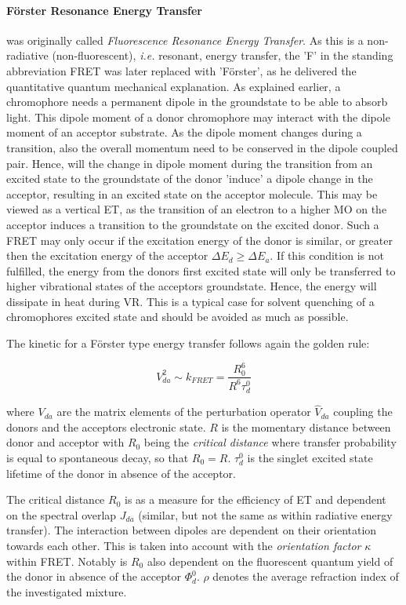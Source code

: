 			\paragraph{Förster Resonance Energy Transfer} was originally called \emph{Fluorescence Resonance Energy Transfer}. As this is a non-radiative (non-fluorescent), \textit{i.e.} resonant, energy transfer, the 'F' in the standing abbreviation FRET was later replaced with 'Förster', as he delivered the quantitative quantum mechanical explanation.%
			As explained earlier, a chromophore needs a permanent dipole in the groundstate to be able to absorb light. This dipole moment of a donor chromophore may interact with the dipole moment of an acceptor substrate. As the dipole moment changes during a transition, also the overall momentum need to be conserved in the dipole coupled  pair. Hence, will the change in dipole moment during the transition from an excited state to the groundstate of the donor 'induce' a dipole change in the acceptor, resulting in an excited state on the acceptor molecule. This may be viewed as a vertical ET, as the transition of an electron to a higher MO on the acceptor induces a transition to the groundstate on the excited donor. Such a FRET may only occur if the excitation energy of the donor is similar, or greater then the excitation energy of the acceptor $\Delta E_d \geq \Delta E_a$. If this condition is not fulfilled, the energy from the donors first excited state will only be transferred to higher vibrational states of the acceptors groundstate. Hence, the energy will dissipate in heat during VR. This is a typical case for solvent quenching of a chromophores excited state and should be avoided as much as possible. 

			The kinetic for a Förster type energy transfer follows again the golden rule:

			\begin{equation}
				  V_{da}^2 \sim k_{FRET} = \frac{R^6_0}{R^6\tau^0_d}
			\end{equation}

			where $V_{da}$ are the matrix elements of the perturbation operator $\hat{V}_{da}$ coupling the donors and the acceptors electronic state. $R$ is the momentary distance between donor and acceptor with $R_0$ being the \emph{critical distance} where transfer probability is equal to spontaneous decay, so that $R_0 = R$. $\tau^0_d$ is the singlet excited state lifetime of the donor in absence of the acceptor. 

			The critical distance $R_0$ is as a measure for the efficiency of ET and dependent on the spectral overlap $J_{da}$ (similar, but not the same as within radiative energy transfer). The interaction between dipoles are dependent on their orientation towards each other. This is taken into account with the \emph{orientation factor} $\kappa$ within FRET. Notably is $R_0$ also dependent on the fluorescent quantum yield of the donor in absence of the acceptor $\Phi^0_d$. $\rho$ denotes the average refraction index of the investigated mixture. 

